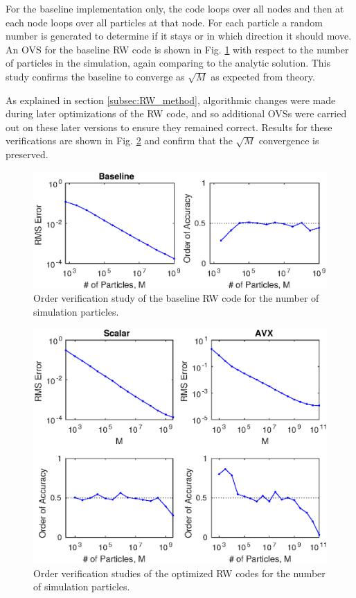 \documentclass[letterpaper]{article}
\begin{document}
For the baseline implementation only, the code loops over all nodes and then at each node loops over all particles at that node. For each particle a random number is generated to determine if it stays or in which direction it should move. An OVS for the baseline RW code is shown in Fig. \ref{fig:OVS_RW_1} with respect to the number of particles in the simulation, again comparing to the analytic solution. This study confirms the baseline to converge as $\sqrt{M}$ as expected from theory.

As explained in section \ref{subsec:RW_method}, algorithmic changes were made during later optimizations of the RW code, and so additional OVSs were carried out on these later versions to ensure they remained correct. Results for these verifications are shown in Fig. \ref{fig:OVS_RW_2} and confirm that the $\sqrt{M}$ convergence is preserved.

\begin{figure}[!b]\centering
  \includegraphics[width=\linewidth]{./plots/OVS_RW_1.eps}
  \caption{Order verification study of the baseline RW code for the number of simulation particles.}
  \label{fig:OVS_RW_1}
\end{figure}

\begin{figure}\centering
  \includegraphics[width=\linewidth]{./plots/OVS_RW_2.eps}
  \caption{Order verification studies of the optimized RW codes for the number of simulation particles.}
  \label{fig:OVS_RW_2}
\end{figure}
\end{document}
